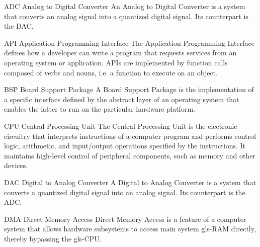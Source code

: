 \usepackage[xindy, nopostdot, numberedsection, style=super, section, toc, acronyms, nogroupskip]{glossaries}
\usepackage{xparse}

\setlength{\glsdescwidth}{0.8\textwidth}
\renewcommand{\glsnamefont}[1]{\textbf{#1}}

 {
}


%
  {ADC}%
  {Analog to Digital Converter}%
  {An Analog to Digital Converter is a system that converts an analog signal
   into a quantized digital signal. Its counterpart is the \gls{DAC}.}%

%
  {API}%
  {Application Programming Interface}%
  {The Application Programming Interface defines how a developer can write
   a program that requests services from an operating system or application.
   \glspl{API} are implemented by function calls composed of verbs and nouns,
   i.e. a function to execute on an object.}%

%
  {BSP}%
  {Board Support Package}%
  {A Board Support Package is the implementation of a specific interface defined
   by the abstract layer of an operating system that enables the latter to run
   on the particular hardware platform.}%

%
  {CPU}%
  {Central Processing Unit}%
  {The Central Processing Unit is the electronic circuitry that interprets
  instructions of a computer program and performs control logic, arithmetic,
  and input/output operations specified by the instructions. It maintains
  high-level control of peripheral components, such as memory and other devices.}%

%
  {DAC}%
  {Digital to Analog Converter}%
  {A Digital to Analog Converter is a system that converts a quantized digital
   signal into an analog signal. Its counterpart is the \gls{ADC}.}%

%
  {DMA}%
  {Direct Memory Access}%
  {Direct Memory Access is a feature of a computer system that allows hardware
   subsystems to access main system \gls{gls-RAM} directly, thereby bypassing
   the \gls{gls-CPU}.}%

